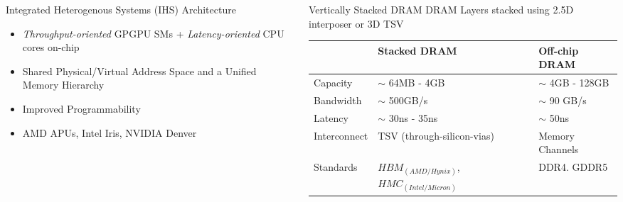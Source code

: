 \documentclass[final,t]{beamer}
\begin{document}
\begin{frame}[t,fragile]{}
\begin{tcolorbox}[colback=red!5!white,
                      colframe=red!75!black,
                     ]
\begin{columns}[t]
\begin{column}{.48\linewidth}
\begin{exampleblock}{Integrated Heterogenous Systems (IHS) Architecture}
        	\begin{itemize}
    	    	\item \textit{Throughput-oriented} GPGPU SMs + \textit{Latency-oriented} CPU cores on-chip
       			\item Shared Physical/Virtual Address Space and a Unified Memory Hierarchy 
    	    	\item Improved Programmability
    			\item AMD APUs, Intel Iris, NVIDIA Denver
    	        \end{itemize}    
    		\begin{figure}
    			\centering
    			\def\svgwidth{0.815\linewidth}
    			 
    		\end{figure}
            \end{exampleblock}
     \end{column}
     \begin{column}{.48\linewidth}
        \begin{exampleblock}{Vertically Stacked DRAM}
            	\centering DRAM Layers stacked using 2.5D interposer or 3D TSV
\vspace{1.5em}
\begin{table}[]
\centering
\setlength{\tabcolsep}{1em}
\begin{tabular}{lll}
             & \textbf{Stacked DRAM}                                                     & \textbf{Off-chip DRAM} \\
             \hline
Capacity     & $\sim$ 64MB - 4GB                                                         & $\sim$ 4GB - 128GB     \\
Bandwidth    & $\sim$ 500GB/s                                                            & $\sim$ 90 GB/s         \\
Latency      & $\sim$ 30ns - 35ns                                                        & $\sim$ 50ns            \\
Interconnect & TSV (through-silicon-vias)                                                & Memory Channels        \\
Standards    & $HBM_{(AMD/Hynix)}$, $HMC_{(Intel/Micron)}$ & DDR4. GDDR5           
\end{tabular}
\end{table}
\vspace{0.9em}
            		\begin{figure}
            			\centering
            			\def\svgwidth{0.8\linewidth}
            			 
            		\end{figure}
        \end{exampleblock}
      \end{column}
      \end{columns}
    \end{tcolorbox}


\end{frame}
\end{document}

